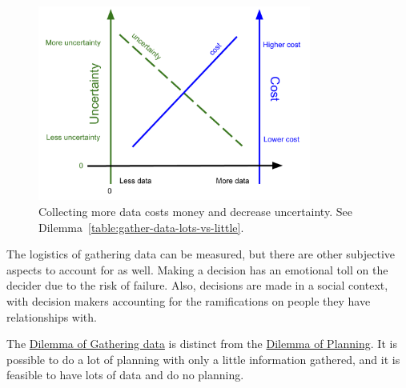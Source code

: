 \begin{figure}[H] %
        \centering
        \includegraphics[width=0.8\textwidth]{images/cost_and_uncertainty_for_data_collection}
        \caption{Collecting more data costs money and decrease uncertainty. See Dilemma~\ref{table:gather-data-lots-vs-little}.}
        \label{fig:data_collection_cost_uncertainty}
\end{figure}

The logistics of gathering data can be measured, but there are other subjective aspects to account for as well. Making a decision has an emotional toll on the decider due to the risk of failure. Also, decisions are made in a social context, with decision makers accounting for the ramifications on people they have relationships with. 



The \hyperref[table:gather-data-lots-vs-little]{Dilemma of Gathering data} is distinct from the \hyperref[table:planning]{Dilemma of Planning}. It is possible to do a lot of planning with only a little information gathered, and it is feasible to have lots of data and do no planning. 

